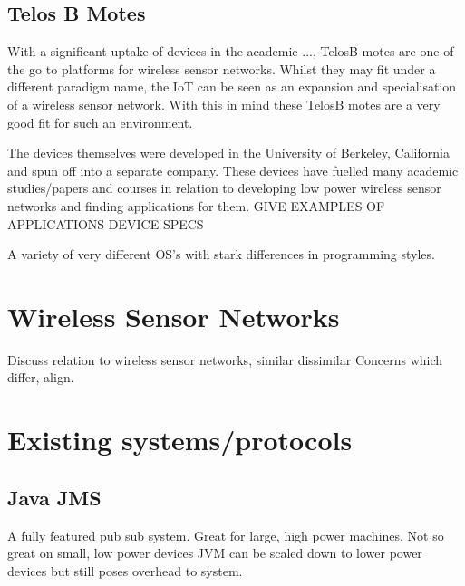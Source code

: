 \documentclass{l4proj}
\begin{document}
\subsection{Telos B Motes} %
\label{sub:telos_b_motes}

With a significant uptake of devices in the academic ..., TelosB motes are one of the go to platforms for wireless sensor networks.
Whilst they may fit under a different paradigm name, the IoT can be seen as an expansion and specialisation of a wireless sensor network.
With this in mind these TelosB motes are a very good fit for such an environment. 

The devices themselves were developed in the University of Berkeley, California and spun off into a separate company. These devices have fuelled many academic studies/papers and courses in relation to developing low power wireless sensor networks and finding applications for them.
GIVE EXAMPLES OF APPLICATIONS
DEVICE SPECS

A variety of very different OS's with stark differences in programming styles.

\begin{comment}

Some research 
popular academic tool, many OS's, very low power like Arduino, with radio and sensors
some gpio, but limited
Contiki c like, event and thread driven
\end{comment}
\section{Wireless Sensor Networks} %
\label{sec:wireless_sensor_networks}
Discuss relation to wireless sensor networks, similar dissimilar
Concerns which differ, align.


\section{Existing systems/protocols} %
\label{sec:existing_systems_protocols}

\subsection{Java JMS} %
\label{sub:java_jms}
A fully featured pub sub system.
Great for large, high power machines.
Not so great on small, low power devices
JVM can be scaled down to lower power devices but still poses overhead to system.
\end{document}
